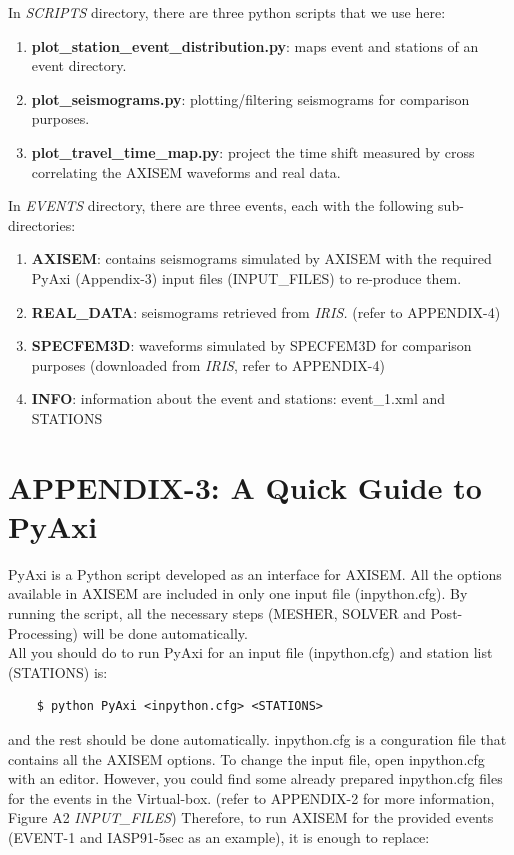 \documentclass{article}
\begin{document}
In \textit{SCRIPTS} directory, there are three python scripts that we use here:

\begin{enumerate}
    \item \textbf{plot\_station\_event\_distribution.py}: maps event and stations of an
    event directory.
    \item \textbf{plot\_seismograms.py}: plotting/filtering seismograms for comparison purposes.
    \item \textbf{plot\_travel\_time\_map.py}: project the time shift measured by cross
    correlating the AXISEM waveforms and real data.
\end{enumerate}

In \textit{EVENTS} directory, there are three events, each with the following
sub-directories:

\begin{enumerate}
    \item \textbf{AXISEM}: contains seismograms simulated by AXISEM with
    the required PyAxi (Appendix-3) input files (INPUT_FILES) to re-produce them.
    \item \textbf{REAL\_DATA}: seismograms retrieved from \textit{IRIS. }(refer to
    APPENDIX-4)
    \item \textbf{SPECFEM3D}: waveforms simulated by SPECFEM3D for comparison purposes 
    (downloaded from\textit{ IRIS}, refer to APPENDIX-4)
    \item \textbf{INFO}: information about the event and stations: event\_1.xml and
    STATIONS
\end{enumerate}


\newpage
\section{APPENDIX-3: A Quick Guide to PyAxi}

PyAxi is a Python script developed as an interface for AXISEM. All the options 
available in AXISEM are included in only one input file (inpython.cfg). By running 
the script, all the necessary steps (MESHER, SOLVER and Post-Processing) will be 
done automatically. \\

All you should do to run PyAxi for an input file (inpython.cfg) and station list 
(STATIONS) is:
\begin{verbatim}
    $ python PyAxi <inpython.cfg> <STATIONS>
\end{verbatim}

and the rest should be done automatically. inpython.cfg is a conguration file that 
contains all the AXISEM options. To change the input file, open inpython.cfg with 
an editor. However, you could find some already prepared inpython.cfg files for 
the events in the Virtual-box. (refer to APPENDIX-2 for more information, Figure A2 
\textit{INPUT\_FILES}) Therefore, to run AXISEM for the provided events (EVENT-1 
and IASP91-5sec as an example), it is enough to replace:
\end{document}
